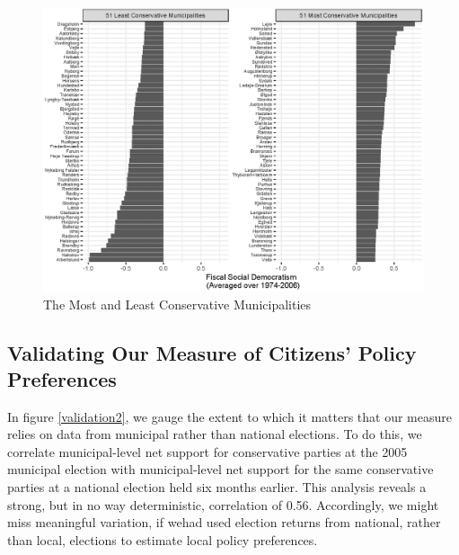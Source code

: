 \documentclass[a4paper,12pt]{article}
\begin{document}
\begin{figure}
	\centering
	\includegraphics[width=1\textwidth]{conservatism_24092018.eps}
	\caption{The Most and Least Conservative Municipalities} \label{mostleast}
\end{figure}

\clearpage


\subsection{Validating Our Measure of Citizens' Policy Preferences} \label{validation}

\setcounter{table}{0}
\setcounter{figure}{0}


In figure \ref{validation2}, we gauge the extent to which it matters that our measure relies on data from municipal rather than national elections. To do this, we correlate  municipal-level net support for conservative parties at the 2005 municipal election with municipal-level net support for the same conservative parties at a national election held six months earlier. This analysis reveals a strong, but in no way deterministic, correlation of 0.56. Accordingly, we might miss meaningful variation, if wehad  used election returns from national, rather than local, elections to estimate local policy preferences.
\end{document}
